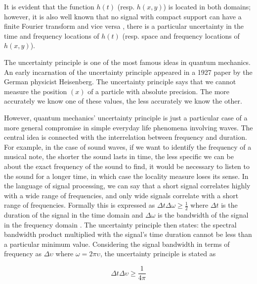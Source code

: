 \documentclass[journal]{IEEEtran}
\begin{document}

It is evident that the function $h(t)$ (resp. $h(x, y)$) is located in both domains; however, it is also well known that no signal with compact support can have a finite Fourier transform and vice versa \cite{Bracewell:FourierBook:1999}, there is a particular uncertainty in the time and frequency locations of $h(t)$ (resp. space and frequency locations of $h(x, y)$).


The uncertainty principle is one of the most famous ideas in quantum mechanics. An early incarnation of the uncertainty principle appeared in a 1927 paper by the German physicist Heisenberg. The uncertainty principle says that we cannot measure the position $(x)$ of a particle with absolute precision. The more accurately we know one of these values, the less accurately we know the other.

However, quantum mechanics' uncertainty principle is just a particular case of a more general compromise in simple everyday life phenomena involving waves. The central idea is connected with the interrelation between frequency and duration. For example, in the case of sound waves, if we want to identify the frequency of a musical note, the shorter the sound lasts in time, the less specific we can be about the exact frequency of the sound to find, it would be necessary to listen to the sound for a longer time, in which case the locality measure loses its sense. In the language of signal processing, we can say that a short signal correlates highly with a wide range of frequencies, and only wide signals correlate with a short range of frequencies. Formally this is expressed as $\Delta t\Delta \omega \geq \frac{1}{2}$ where $\Delta t$ is the duration of the signal in the time domain and $\Delta \omega$ is the bandwidth of the signal in the frequency domain \cite{Petrou.Sevilla:Book:2006}. The uncertainty principle then states: the spectral bandwidth product multiplied with the signal's time duration cannot be less than a particular minimum value. Considering the signal bandwidth in terms of frequency as $\Delta \upsilon$ where $\omega = 2\pi \upsilon$, the uncertainty principle is stated as 

\begin{equation}\label{eq:uncertainty_principle_freq}
	\Delta t\Delta \upsilon \geq \frac{1}{4\pi}
\end{equation}
\end{document}
